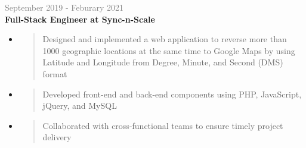 \documentclass[letterpage]{article}
\begin{document}
\begin{minipage}[t]{0.61\linewidth}
\vspace{7px}
\textcolor{gray}{September 2019 - Feburary 2021}\\
\textbf{\textsf{Full-Stack Engineer at Sync-n-Scale}}
\begin{itemize}[leftmargin=*,labelindent=1mm,labelsep=0mm]
\item
  \begin{quote}
  \raggedright
  Designed and implemented a web application to reverse more than 1000 geographic locations at the same time to Google Maps by using Latitude and Longitude from Degree, Minute, and Second (DMS) format
  \end{quote}
\item
  \begin{quote}
  \raggedright
  Developed front-end and back-end components using PHP, JavaScript, jQuery, and MySQL
  \end{quote}
\item
  \begin{quote}
  \raggedright
  Collaborated with cross-functional teams to ensure timely project delivery
  \end{quote}
\end{itemize}

\end{minipage}
\end{document}
